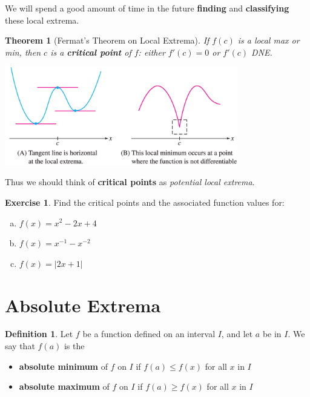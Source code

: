 \documentclass[11pt,reqno,final]{amsart}
\numberwithin{figure}{section}
\newtheorem{theorem}[equation]{Theorem}%
\theoremstyle{definition} %
\newtheorem{definition}[equation]{Definition}%
\newtheorem{exercise}[question]{Exercise}
\begin{document}
We will spend a good amount of time in the future \textbf{finding} and \textbf{classifying} these local extrema.

\begin{theorem}[Fermat's Theorem on Local Extrema]
        If $f(c)$ is a local max or min, then $c$ is a \textbf{critical point} of $f$:
        either $f'(c) = 0$ or $f'(c)$ DNE.
        \begin{center}
                \includegraphics[width=4in]{11-09P_cp.png}
        \end{center}
\end{theorem}

Thus we should think of \textbf{critical points} as \textit{potential local extrema}.

\newpage

\begin{exercise}
        Find the critical points and the associated function values for:
        \begin{enumerate}[(a)]
        \item $f(x) = x^2 - 2x+4$
                \vfill
        \item $f(x) = x^{-1} - x^{-2}$
                \vfill
        \item $f(x) = |2x+1|$
                \vfill                
        \end{enumerate}
\end{exercise}

\newpage

\section{Absolute Extrema}

\begin{definition}
        Let $f$ be a function defined on an interval $I$, and let $a$ be in $I$. We say that $f(a)$ is the
        \begin{itemize}
        \item \textbf{absolute minimum} of $f$ on $I$ if $f(a) \leq f(x)$ for all $x$ in $I$
        \item \textbf{absolute maximum} of $f$ on $I$ if $f(a) \geq f(x)$ for all $x$ in $I$
        \end{itemize}
\end{definition}
\end{document}
